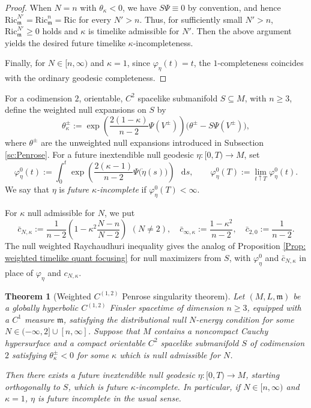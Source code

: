 \documentclass[a4paper,11pt]{article}
\numberwithin{equation}{section}
\theoremstyle{definition}
\theoremstyle{plain}
\newtheorem{Theorem}[Definition]{Theorem}
\newcommand{\Ric}{\mathrm{Ric}}
\newcommand{\m}{\mathfrak m}
\newcommand*\diff{\mathop{}\!\mathrm{d}}
\begin{document}
\begin{proof}
When $N=n$ with $\theta_\kappa<0$, we have $S\Psi \equiv 0$ by convention, and hence $\Ric_\m^{N'} =\Ric_\m^n =\Ric$ for every $N'>n$.
Thus, for sufficiently small $N'>n$, $\Ric_\m^{N'} \ge 0$ holds and $\kappa$ is timelike admissible for $N'$.
Then the above argument yields the desired future timelike $\kappa$-incompleteness.

Finally, for $N\in[ n,\infty)$ and $\kappa=1$, since $\varphi_\eta(t)=t$, the $1$-completeness coincides with the ordinary geodesic completeness. 
\end{proof}

For a codimension $2$, orientable, $C^2$ spacelike submanifold $S\subseteq M$, with $n\geq3$, define the weighted null expansions on $S$ by
\[
    \theta_\kappa^\pm
    :=
    \exp\left(
        \frac{2(1-\kappa)}{n-2}\Psi(V^\pm)
    \right)
    \bigl(\theta^\pm-S\Psi(V^\pm)\bigr),
\]
where $\theta^\pm$ are the unweighted null expansions introduced in Subsection \ref{sc:Penrose}.
For a future inextendible null geodesic $\eta:[0,T)\to M$, set
\[
    \varphi_\eta^0(t)
    :=
    \int_0^t
    \exp\left(
        \frac{2(\kappa-1)}{n-2}\Psi\bigl(\dot\eta(s)\bigr)
    \right)\,\diff s,
    \qquad
    \varphi_\eta^0(T)
    :=
    \lim_{t\uparrow T}\varphi_\eta^0(t).
\]
We say that $\eta$ is \emph{future $\kappa$-incomplete} if $\varphi_\eta^0(T)<\infty$.

For $\kappa$ null admissible for $N$, we put
\[
    \bar c_{N,\kappa}
    :=
    \frac1{n-2}
    \left(1-\kappa^2\frac{N-n}{N-2}\right) \,\ (N\ne2),
    \quad \bar c_{\infty,\kappa}:=\frac{1-\kappa^2}{n-2},
    \quad \bar c_{2,0}:=\frac1{n-2}.
\]
The null weighted Raychaudhuri inequality \cite[Prop.\ 6.2]{LuMinguzziOhtaSingularity} gives the analog of Proposition \ref{Prop: weighted timelike quant focusing} for null maximizers from $S$, with $\varphi_\eta^0$ and $\bar c_{N,\kappa}$ in place of $\varphi_\eta$ and $c_{N,\kappa}$.



\begin{Theorem}[Weighted $C^{(1,2)}$ Penrose singularity theorem]
\label{theorem: weighted penrose}
Let $(M,L,\mathfrak m)$ be a globally hyperbolic $C^{(1,2)}$ Finsler spacetime of dimension $n\geq3$, equipped with a $C^1$ measure  $\mathfrak m$, satisfying the distributional null $N$-energy condition for some $N\in(-\infty,2]\cup[n,\infty]$.
Suppose that $M$ contains a noncompact Cauchy hypersurface and a compact orientable $C^2$ spacelike submanifold $S$ of codimension $2$ satisfying $\theta_\kappa^\pm<0$ for some $\kappa$ which is null admissible for $N$. 

Then there exists a future inextendible null geodesic $\eta:[0,T)\to M$, starting orthogonally to $S$, which is future $\kappa$-incomplete.
In particular, if $N\in[n,\infty)$ and $\kappa=1$, $\eta$ is future incomplete in the usual sense.
\end{Theorem}
\end{document}
